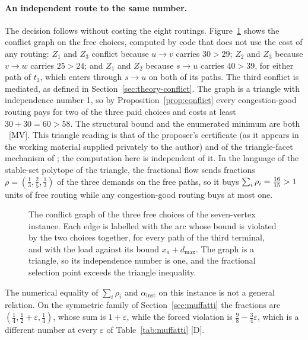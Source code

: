 \documentclass[11pt]{article}
\theoremstyle{remark}
\newcommand{\dmax}{d_{\max}}
\begin{document}


\paragraph{An independent route to the same number.} The decision follows without costing the eight routings. Figure~\ref{fig:conflict} shows the conflict graph on the free choices, computed by code that does not use the cost of any routing: $Z_1$ and $Z_3$ conflict because $u\to v$
carries $30>29$; $Z_2$ and $Z_3$ because $v\to w$ carries $25>24$; and $Z_1$ and $Z_2$ because $s\to u$ carries $40>39$, for either path of $t_3$, which enters through $s\to u$ on both of its paths. The third conflict is mediated, as defined in Section~\ref{sec:theory-conflict}. The graph is a triangle with
independence number 1, so by Proposition~\ref{prop:conflict} every congestion-good routing pays for two of the three paid choices and costs at least $30+30=60>58$. The structural bound and the enumerated minimum are both \nmingood\ [MV]. This triangle reading is that of the proposer's certificate (as it appears in the working material supplied privately to the author) and of the triangle-facet mechanism of \cite{Muf26}; the computation here is independent of it. In the language of the stable-set polytope of the triangle, the fractional flow
sends fractions $\rho=(\tfrac13,\tfrac25,\tfrac13)$ of the three demands on the free paths, so it buys $\sum_i\rho_i=\tfrac{16}{15}>1$ units of free routing while any congestion-good routing buys at most one.

\begin{figure}[t]
\centering

\caption{The conflict graph of the three free choices of the seven-vertex instance. Each edge is labelled with the arc whose bound is violated by the two choices together, for every path of the third terminal, and with the load against its bound $x_a+\dmax$. The graph is a triangle, so its independence number is one, and the fractional selection point exceeds the triangle inequality.}
\label{fig:conflict}
\end{figure}

The numerical equality of $\sum_i\rho_i$ and $\alpha_{\mathrm{inst}}$ on this instance is not a general relation. On the symmetric family of Section~\ref{sec:muffatti} the fractions are $(\tfrac14,\tfrac12+\varepsilon,\tfrac14)$, whose sum is $1+\varepsilon$, while the forced violation is $\tfrac98-\tfrac34\varepsilon$, which is a different number at every $\varepsilon$ of Table~\ref{tab:muffatti} [D].
\end{document}
